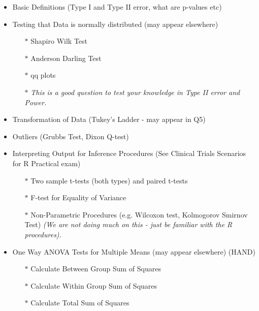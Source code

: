 \documentclass[a4paper,12pt]{article}
\begin{document}
\begin{framed}

\begin{itemize}
		\item Basic Definitions (Type I and Type II error, what are p-values etc)
	\item Testing that Data is normally distributed (may appear elsewhere)
	\begin{itemize}
		\item[$\ast$] Shapiro Wilk Test
		\item[$\ast$] Anderson Darling Test
		\item[$\ast$] qq plots
		\item[$\ast$] \textit{This is a good question to test your knowledge  in Type II error and Power.}
	\end{itemize}
	\item Transformation of Data (Tukey's Ladder - may appear in Q5)

	\item Outliers (Grubbs Test, Dixon Q-test)
	
	\item Interpreting Output for Inference Procedures (See Clinical Trials Scenarios for R Practical exam)
	\begin{itemize}
		\item[$\ast$] Two sample t-tests (both types) and paired t-tests 
		\item[$\ast$] F-test for Equality of Variance
		\item[$\ast$] Non-Parametric Procedures (e.g. Wilcoxon test, Kolmogorov Smirnov Test) \textit{(We are not doing much on this - just be familiar with the R procedures).}
	\end{itemize}
	\item One Way ANOVA Tests for Multiple Means (may appear elsewhere) (HAND)
	\begin{itemize}
		\item[$\ast$] Calculate Between Group Sum of Squares
			\item[$\ast$]  Calculate Within Group Sum of Squares
				\item[$\ast$]  Calculate Total Sum of Squares
			\end{itemize}
\end{itemize}

\end{framed}
\newpage
\end{document}
